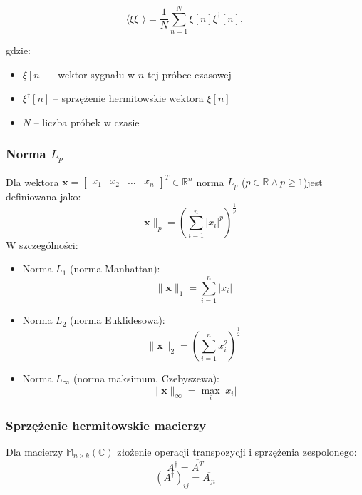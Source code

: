 \documentclass[12pt]{article}
\begin{document}
\begin{equation}
\langle \xi\xi^{\dagger} \rangle = \frac{1}{N} \sum_{n=1}^{N} \xi[n] \xi^{\dagger}[n],
\end{equation}

gdzie:

\begin{itemize}
    \item \( \xi[n] \) – wektor sygnału w \( n \)-tej próbce czasowej
    \item \( \xi^{\dagger}[n] \) – sprzężenie hermitowskie wektora \( \xi[n] \)
    \item \( N \) – liczba próbek w czasie
\end{itemize}

\subsubsection{Norma $L_p$}
Dla wektora $\mathbf{x}=
\begin{bmatrix}
x_1 & x_2 & \hdots & x_n
\end{bmatrix}
^T
\in \mathbb{R}^n
$
norma $L_p$ ($p\in\mathbb{R} \land p\ge 1$)jest definiowana jako:
\begin{equation}
\|\mathbf{x}\|_p = 
\left(
    \sum_{i=1}^{n} |x_i|^p
\right) ^{\frac{1}{p}}
\end{equation}
W szczególności:
\begin{itemize}
\item{Norma $L_1$ (norma Manhattan):
$$
    \|\mathbf{x}\|_1=\sum_{i=1}^{n} |x_i|
$$
}
\item{Norma $L_2$ (norma Euklidesowa):
$$
    \|\mathbf{x}\|_2 = \left( \sum_{i=1}^{n} x_i^2 \right)^{\frac{1}{2}}
$$
}
\item{Norma $L_\infty$ (norma maksimum, Czebyszewa):
$$
    \|\mathbf{x}\|_\infty = \max_i |x_i|
$$
}
\end{itemize}

\subsubsection{Sprzężenie hermitowskie macierzy}
Dla macierzy $\mathbb{M}_{n \times k}(\mathbb{C})$ złożenie operacji transpozycji i sprzężenia zespolonego:
\begin{equation}
A^\dagger=\overline{A^T}
\end{equation}
\begin{equation*}
\left( A^\dagger \right)_{ij}=\overline{A_{ji}}
\end{equation*}
\end{document}
